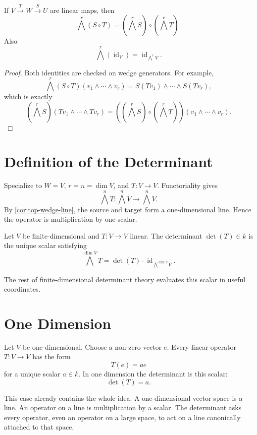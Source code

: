 \documentclass[11pt]{memoir}
\providecommand{\id}{\operatorname{id}}
\providecommand{\Cref}[1]{\ref{#1}}
\begin{document}
\begin{proposition}[functoriality]
\label{prop:wedge-functoriality}
If \(V\xrightarrow{T}W\xrightarrow{S}U\) are linear maps, then
\[
  \bigwedge^r(S\circ T)=(\bigwedge^rS)\circ(\bigwedge^rT).
\]
Also
\[
  \bigwedge^r(\id_V)=\id_{\bigwedge^rV}.
\]
\end{proposition}

\begin{proof}
Both identities are checked on wedge generators. For example,
\[
  \bigwedge^r(S\circ T)(v_1\wedge\cdots\wedge v_r)
  =
  S(Tv_1)\wedge\cdots\wedge S(Tv_r),
\]
which is exactly
\[
  (\bigwedge^rS)(Tv_1\wedge\cdots\wedge Tv_r)
  =
  ((\bigwedge^rS)\circ(\bigwedge^rT))(v_1\wedge\cdots\wedge v_r).
\]
\end{proof}

\section{Definition of the Determinant}
\label{sec:det-definition}

Specialize to \(W=V\), \(r=n=\dim V\), and \(T:V\to V\). Functoriality
gives
\[
  \bigwedge^nT:\bigwedge^nV\to\bigwedge^nV.
\]
By \Cref{cor:top-wedge-line}, the source and target form a
one-dimensional line. Hence the operator is multiplication by one
scalar.

\begin{definition}
\label{def:operator-det}
Let \(V\) be finite-dimensional and \(T:V\to V\) linear. The
determinant \(\det(T)\in k\) is the unique scalar satisfying
\[
  \bigwedge^{\dim V}T
  =
  \det(T)\cdot \id_{\bigwedge^{\dim V}V}.
\]
\end{definition}

The rest of finite-dimensional determinant theory evaluates this
scalar in useful coordinates.

\section{One Dimension}
\label{sec:one-dimension}

Let \(V\) be one-dimensional. Choose a non-zero vector \(e\). Every
linear operator \(T:V\to V\) has the form
\[
  T(e)=a e
\]
for a unique scalar \(a\in k\). In one dimension the determinant is
this scalar:
\[
  \det(T)=a.
\]

This case already contains the whole idea. A one-dimensional vector
space is a line. An operator on a line is multiplication by a scalar.
The determinant asks every operator, even an operator on a large
space, to act on a line canonically attached to that space.
\end{document}
